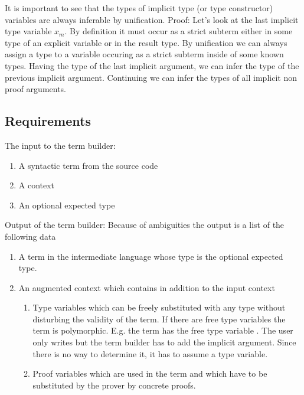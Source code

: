 It is important to see that the types of implicit type (or type constructor)
variables are always inferable by unification. Proof: Let's look at the last
implicit type variable $x_m$. By definition it must occur as a strict subterm
either in some type of an explicit variable or in the result type. By
unification we can always assign a type to a variable occuring as a strict
subterm inside of some known types. Having the type of the last implicit
argument, we can infer the type of the previous implicit argument. Continuing
we can infer the types of all implicit non proof arguments.





\subsection{Requirements}

The input to the term builder:
%
\begin{enumerate}

\item A syntactic term from the source code

\item A context

\item An optional expected type
\end{enumerate}

Output of the term builder: Because of ambiguities the output is a list of the
following data
%
\begin{enumerate}

\item A term in the intermediate language whose type is the optional expected
  type.

\item An augmented context which contains in addition to the input context
  \begin{enumerate}
  \item Type variables which can be freely substituted with any type without
    disturbing the validity of the term. If there are free type variables the
    term is polymorphic. E.g. the term  has the free type variable
    . The user only writes  but the term builder has to
    add the implicit argument. Since there is no way to determine it, it has
    to assume a type variable.
  \item Proof variables which are used in the term and which have to be
    substituted by the prover by concrete proofs.
  \end{enumerate}
\end{enumerate}


